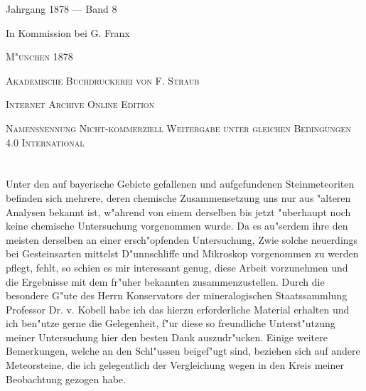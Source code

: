 \documentclass[a4paper, 11pt, oneside]{article}
\begin{document}
\begin{titlepage}
	{\Large Jahrgang 1878 --- Band 8} %
	
	\vspace*{1\baselineskip} %
	
    {\Large In Kommission bei G. Franx} %
    
    \vspace*{\fill}

	\vspace{1\baselineskip}

	{\small\scshape M"unchen 1878}
	
	{\small\scshape{Akademische Buchdruckerei von F. Straub}}
	
	\vspace{0.5\baselineskip} %

    \scshape Internet Archive Online Edition  %
	
	{\scshape\small Namensnennung Nicht-kommerziell Weitergabe unter gleichen Bedingungen 4.0 International} %
\end{titlepage}
\setlength{\parskip}{1mm plus1mm minus1mm}
\clearpage
\tableofcontents
\clearpage
\LARGE
\pagestyle{fancy}
\fancyhf{}
\cfoot{\swabfamily{\thepage}}
\section{}
\subsection*{}
\paragraph{}
Unter den auf bayerische Gebiete gefallenen und aufgefundenen Steinmeteoriten befinden sich mehrere, deren chemische Zusammensetzung uns nur aus "alteren Analysen bekannt ist, w"ahrend von einem derselben bis jetzt "uberhaupt noch keine chemische Untersuchung vorgenommen wurde. Da es au"serdem ihre den meisten derselben an einer ersch"opfenden Untersuchung, Zwie solche neuerdings bei Gesteinsarten mittelst D"unnschliffe und Mikroskop vorgenommen zu werden pflegt, fehlt, so schien es mir interessant genug, diese Arbeit vorzunehmen und die Ergebnisse mit dem fr"uher bekannten zusammenzustellen. Durch die besondere G"ute des Herrn Konservators der mineralogischen Staatssammlung Professor Dr. v. Kobell habe ich das hierzu erforderliche Material erhalten und ich ben"utze gerne die Gelegenheit, f"ur diese so freundliche Unterst"utzung meiner Untersuchung hier den besten Dank auszudr"ucken. Einige weitere Bemerkungen, welche an den Schl"ussen beigef"ugt sind, beziehen sich auf andere Meteorsteine, die ich gelegentlich der Vergleichung wegen in den Kreis meiner Beobachtung gezogen habe.
\end{document}
